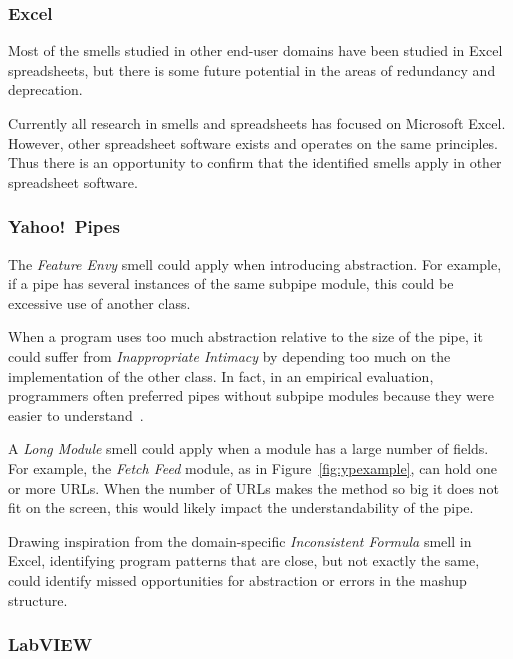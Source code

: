 \documentclass{sig-alternate}
\begin{document}
\subsubsection{Excel}
Most of the smells studied in other end-user domains have been studied in Excel spreadsheets, but there is some future potential in the areas of redundancy and deprecation.

Currently all research in smells and spreadsheets has focused on Microsoft Excel.
However, other spreadsheet software exists and operates on the same principles.
Thus there is an opportunity to confirm that the identified smells apply in other spreadsheet software.

\subsubsection{Yahoo!\ Pipes}
\label{sec:smells:future:yp}
The \emph{Feature Envy} smell could  apply when introducing abstraction. For example, if a pipe has several instances of the same subpipe module, this could be excessive use of another class. 

When a program uses too much abstraction relative to the size of the pipe, it could suffer from \emph{Inappropriate Intimacy} by depending too much on the implementation of the other class. In fact, in an empirical evaluation, programmers often preferred pipes without subpipe modules because they were easier to understand~\cite{StoleeTSE2013}. 

A \emph{Long Module} smell could apply when a module has a large number of fields. For example, the \emph{Fetch Feed} module, as in Figure~\ref{fig:ypexample}, can hold one or more URLs. When the number of URLs makes the method so big it does not fit on the screen, this would likely impact the understandability of the pipe. 

Drawing inspiration from the domain-specific \emph{Inconsistent Formula} smell in Excel, identifying program patterns that are close, but not exactly the same, could identify missed opportunities for abstraction or errors in the mashup structure. 

\subsubsection{LabVIEW}
\end{document}
